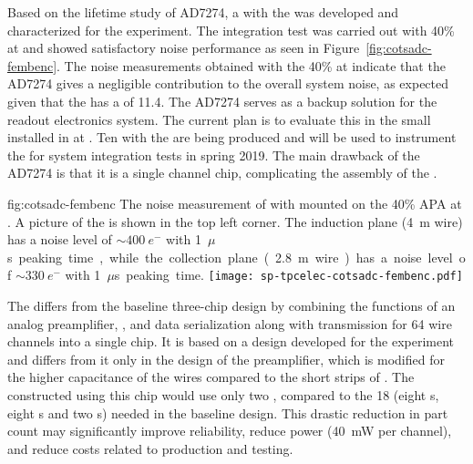 Based on the lifetime study of AD7274, a  with the  
 was developed and characterized for the  experiment. The 
integration test was carried out with 40\%  at  and 
showed satisfactory noise performance as seen in Figure~\ref{fig:cotsadc-fembenc}.
The noise measurements obtained with the  40\%  at  indicate
that the AD7274 gives a negligible contribution to the overall system noise, as
expected given that the  has a 
of \num{11.4}. The   AD7274 serves as a backup solution for the 
   readout electronics system. The current 
plan is to evaluate this  in the small  installed in
 at . Ten  with the  
 are being produced and will be used to instrument the  
 for system integration tests in spring 2019. The main drawback of
the AD7274  is that it is a single channel chip, complicating the 
assembly of the .

\begin{dunefigure}
{fig:cotsadc-fembenc}
{The noise measurement of  with   
mounted on the \num{40}\% APA at . A picture of the 
 is shown in the top left corner. The induction plane 
(\SI{4}{m} wire) has a noise level of $\sim\SI{400}{e^-}$ with \SI{1}{$\mu$s} 
peaking time, while the collection plane (\SI{2.8}{m} wire) has a noise level
of $\sim\SI{330}{e^-}$ with \SI{1}{$\mu$s} peaking time.}
\texttt{[image: sp-tpcelec-cotsadc-fembenc.pdf]}
\end{dunefigure}

\label{sec:fdsp-tpcelec-design-femb-alt-cryo}


The    differs from the baseline three-chip 
design by combining the functions of an analog preamplifier, , and 
data serialization along with transmission for \num{64} wire channels into a single 
chip. It is based on a design developed for the  experiment~\cite{nEXO} 
and differs from it only in the design of the preamplifier, which is modified for 
the higher capacitance of the   wires compared to the short
strips of . The  constructed using this chip would use only 
two , compared to the \num{18} (eight s, eight s and 
two s) needed in the baseline design. This drastic reduction in 
part count may significantly improve  reliability, reduce power 
(\SI{40}{mW} per channel), and reduce costs related to production and testing.

